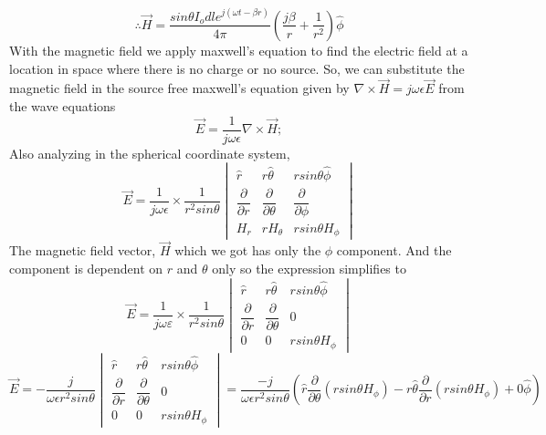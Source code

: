 \begin{equation}
\therefore \vec{H} = \dfrac{sin\theta I_o dl e^{j(\omega t-\beta r)} }{4\pi} \left(\dfrac{j\beta}{r} + \dfrac{1}{r^2}\right)\hat{\phi}
\end{equation}
With the magnetic field we apply maxwell's equation to find the electric field at a location in space where there is no charge or no source. So, we can substitute the magnetic field in the source free maxwell's equation given by $\nabla \times \vec{H} = j\omega \epsilon\vec{E}$ from the wave equations 
$$\vec{E} = \dfrac{1}{j\omega \epsilon}\nabla \times \vec{H};$$Also analyzing in  the spherical coordinate system, 
\begin{equation*}
\vec{E}  = \dfrac{1}{j\omega \epsilon} \times \dfrac{1}{r^2sin\theta}
\begin{vmatrix}
\hat{r} & r\hat{\theta} & rsin\theta\hat{\phi} \\ 
\dfrac{\partial}{\partial r} & \dfrac{\partial}{\partial \theta} &  \dfrac{\partial}{\partial \phi} \\
H_r & rH_\theta & rsin\theta H_\phi              
\end{vmatrix}
\end{equation*}
The magnetic field vector, $\vec{H}$ which we got has only the $\phi$ component. And the component is dependent on $r$ and $\theta$ only so the expression simplifies to 
\begin{equation*}
\vec{E}  = \dfrac{1}{j\omega \varepsilon} \times \dfrac{1}{r^2sin\theta}
\begin{vmatrix}
\hat{r} & r\hat{\theta} & rsin\theta\hat{\phi} \\ 
\dfrac{\partial}{\partial r} & \dfrac{\partial}{\partial \theta} &  0 \\
0 & 0 & rsin\theta H_\phi              
\end{vmatrix}
\end{equation*}
\begin{dmath*}
\vec{E}  = -\dfrac{j}{\omega \epsilon r^2sin\theta}
\begin{vmatrix}
\hat{r} & r\hat{\theta} & rsin\theta\hat{\phi} \\ 
\dfrac{\partial}{\partial r} & \dfrac{\partial}{\partial \theta} &  0 \\
0 & 0 & rsin\theta H_\phi              
\end{vmatrix}  = \dfrac{-j}{\omega  \epsilon r^2 sin\theta}\left(\hat{r} \dfrac{\partial}{\partial \theta}\left(rsin \theta H_{\phi}\right) - r\hat{\theta} \dfrac{\partial}{\partial r}(rsin\theta H_{\phi}) + 0\hat{\phi}\right)
\end{dmath*}

